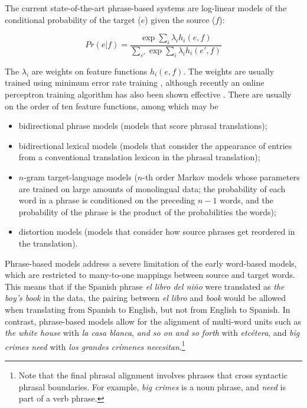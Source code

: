\documentclass[10pt]{report}
\theoremstyle{plain}
\begin{document}
{The current state-of-the-art phrase-based systems are log-linear
models of the conditional probability of the target ($e$) given the
source ($f$):

\begin{equation}
Pr(e|f) = \frac{\exp{\sum_{i} \lambda_i h_i(e,f)}}{\sum_{e'} \exp{\sum_{i} \lambda_i h_i(e',f)}}
\label{loglinear}
\end{equation}

\noindent
The $\lambda_i$ are weights on feature functions $h_i(e,f)$. The
weights are usually trained using minimum error rate training
, although recently an online perceptron training
algorithm has also been shown effective . There are
usually on the order of ten feature functions, among which may be

\begin{itemize}
\item bidirectional phrase models (models that score phrasal translations);
\item bidirectional lexical models (models that consider the
appearance of entries from a conventional translation lexicon in the
phrasal translation);
\item $n$-gram target-language models ($n$-th order Markov models
whose parameters are trained on large amounts of monolingual data; the
probability of each word in a phrase is conditioned on the preceding
$n-1$ words, and the probability of the phrase is the product of the
probabilities the words);
\item distortion models (models that consider how source phrases get
reordered in the translation).
\end{itemize}

Phrase-based models address a severe limitation of the early
word-based models, which are restricted to many-to-one mappings
between source and target words. This means that if the Spanish phrase
{\em el libro del ni\~{n}o} were translated as {\em the boy's book} in
the data, the pairing between {\em el libro} and {\em book} would be
allowed when translating from Spanish to English, but not from English
to Spanish. In contrast, phrase-based models allow for the alignment
of multi-word units such as {\em the white house} with {\em la casa
blanca}, {\em and so on and so forth} with {\em etc\'{e}tera}, and
{\em big crimes need} with {\em los grandes cr\'{i}menes
necesitan}.\footnote{Note that the final phrasal alignment involves
phrases that cross syntactic phrasal boundaries. For example, {\em big
crimes} is a noun phrase, and {\em need} is part of a verb phrase.}

}
\end{document}
